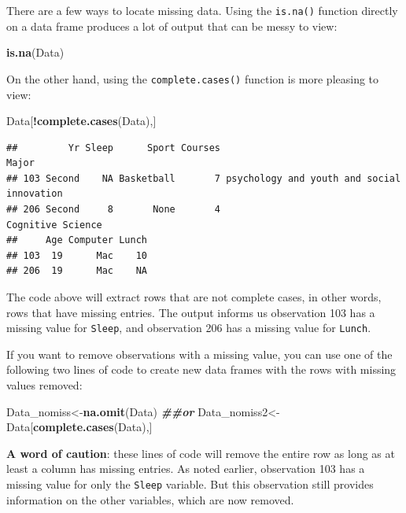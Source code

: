 \documentclass[
]{book}
\newenvironment{Shaded}{\begin{snugshade}}{\end{snugshade}}
\newcommand{\DocumentationTok}[1]{\textcolor[rgb]{0.56,0.35,0.01}{\textbf{\textit{#1}}}}
\newcommand{\FunctionTok}[1]{\textcolor[rgb]{0.13,0.29,0.53}{\textbf{#1}}}
\newcommand{\NormalTok}[1]{#1}
\newcommand{\OtherTok}[1]{\textcolor[rgb]{0.56,0.35,0.01}{#1}}
\newcommand{\SpecialCharTok}[1]{\textcolor[rgb]{0.81,0.36,0.00}{\textbf{#1}}}
\begin{document}
There are a few ways to locate missing data. Using the \texttt{is.na()} function directly on a data frame produces a lot of output that can be messy to view:

\begin{Shaded}
\begin{Highlighting}[]
\FunctionTok{is.na}\NormalTok{(Data)}
\end{Highlighting}
\end{Shaded}

On the other hand, using the \texttt{complete.cases()} function is more pleasing to view:

\begin{Shaded}
\begin{Highlighting}[]
\NormalTok{Data[}\SpecialCharTok{!}\FunctionTok{complete.cases}\NormalTok{(Data),]}
\end{Highlighting}
\end{Shaded}

\begin{verbatim}
##         Yr Sleep      Sport Courses                                      Major
## 103 Second    NA Basketball       7 psychology and youth and social innovation
## 206 Second     8       None       4                          Cognitive Science
##     Age Computer Lunch
## 103  19      Mac    10
## 206  19      Mac    NA
\end{verbatim}

The code above will extract rows that are not complete cases, in other words, rows that have missing entries. The output informs us observation 103 has a missing value for \texttt{Sleep}, and observation 206 has a missing value for \texttt{Lunch}.

If you want to remove observations with a missing value, you can use one of the following two lines of code to create new data frames with the rows with missing values removed:

\begin{Shaded}
\begin{Highlighting}[]
\NormalTok{Data\_nomiss}\OtherTok{\textless{}{-}}\FunctionTok{na.omit}\NormalTok{(Data) }\DocumentationTok{\#\#or}
\NormalTok{Data\_nomiss2}\OtherTok{\textless{}{-}}\NormalTok{Data[}\FunctionTok{complete.cases}\NormalTok{(Data),]}
\end{Highlighting}
\end{Shaded}

\textbf{A word of caution}: these lines of code will remove the entire row as long as at least a column has missing entries. As noted earlier, observation 103 has a missing value for only the \texttt{Sleep} variable. But this observation still provides information on the other variables, which are now removed.
\end{document}
